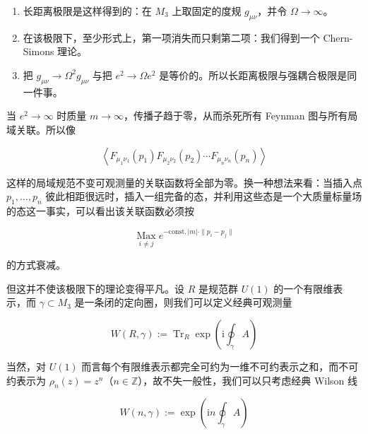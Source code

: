 
\begin{enumerate}
  \item 长距离极限是这样得到的：在 $M_3$ 上取固定的度规 $g_{\mu\nu}$，并令 $\Omega\to\infty$。

  \item 在该极限下，至少形式上，第一项消失而只剩第二项：我们得到一个 Chern-Simons 理论。

  \item 把 $g_{\mu\nu}\to\Omega^{2}g_{\mu\nu}$ 与把 $e^{2}\to\Omega e^{2}$ 是等价的。所以长距离极限与强耦合极限是同一件事。
\end{enumerate}

当 $e^{2}\to\infty$ 时质量 $m\to\infty$，传播子趋于零，从而杀死所有 Feynman 图与所有局域关联。所以像

\begin{equation}
  \left\langle F_{\mu_1\nu_1}(p_1)F_{\mu_2\nu_2}(p_2)\cdots F_{\mu_n\nu_n}(p_n)\right\rangle
  \tag{2.58}
  \label{eq:2.58}
\end{equation}

这样的局域规范不变可观测量的关联函数将全部为零。换一种想法来看：当插入点 $p_1,\dots,p_n$ 彼此相距很远时，插入一组完备的态，并利用这些态是一个大质量标量场的态这一事实，可以看出该关联函数必须按

\begin{equation}
  \operatorname*{Max}_{i\neq j}e^{-\mathrm{const.}\,|m|\cdot\|p_i-p_j\|}
  \tag{2.59}
  \label{eq:2.59}
\end{equation}

的方式衰减。

但这并不使该极限下的理论变得平凡。设 $R$ 是规范群 $U(1)$ 的一个有限维表示，而 $\gamma\subset M_3$ 是一条闭的定向圈，则我们可以定义经典可观测量

\begin{equation}
  W(R,\gamma):=\operatorname{Tr}_R\exp\left(\mathrm{i}\oint_{\gamma}A\right)
  \tag{2.60}
  \label{eq:2.60}
\end{equation}

当然，对 $U(1)$ 而言每个有限维表示都完全可约为一维不可约表示之和，而不可约表示为 $\rho_n(z)=z^{n}$（$n\in\mathbb{Z}$），故不失一般性，我们可以只考虑经典 Wilson 线

\begin{equation}
  W(n,\gamma):=\exp\left(\mathrm{i}n\oint_{\gamma}A\right)
  \tag{2.61}
  \label{eq:2.61}
\end{equation}

